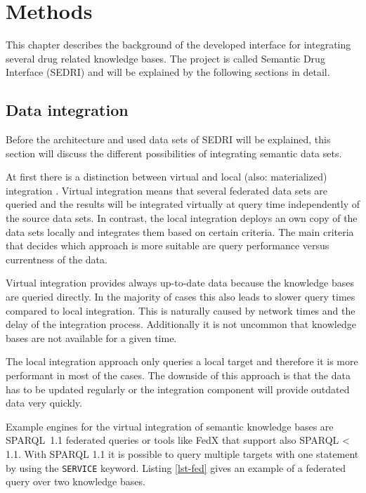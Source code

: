 \chapter{Methods}
\label{cha:methods}

This chapter describes the background of the developed interface for integrating several drug related knowledge bases.
The project is called Semantic Drug Interface (SEDRI) and will be explained by the following sections in detail.

\section{Data integration}
\label{sec:data-integration}

Before the architecture and used data sets of SEDRI will be explained, this section will discuss the different possibilities of integrating semantic data sets.

At first there is a distinction between virtual and local (also: materialized) integration \cite{lenzerini2002data}.
Virtual integration means that several federated data sets are queried and the results will be integrated virtually at query time independently of the source data sets.
In contrast, the local integration deploys an own copy of the data sets locally and integrates them based on certain criteria.
The main criteria that decides which approach is more suitable are query performance versus currentness of the data.

Virtual integration provides always up-to-date data because the knowledge bases are queried directly.
In the majority of cases this also leads to slower query times compared to local integration.
This is naturally caused by network times and the delay of the integration process.
Additionally it is not uncommon that knowledge bases are not available for a given time.

The local integration approach only queries a local target and therefore it is more performant in most of the cases.
The downside of this approach is that the data has to be updated regularly or the integration component will provide outdated data very quickly.

Example engines for the virtual integration of semantic knowledge bases are SPARQL~1.1 federated queries or tools like FedX \cite{schwarte2011fedx} that support also SPARQL < 1.1.
With SPARQL 1.1 it is possible to query multiple targets with one statement by using the \texttt{SERVICE} keyword.
Listing \ref{lst-fed} gives an example of a federated query over two knowledge bases.

